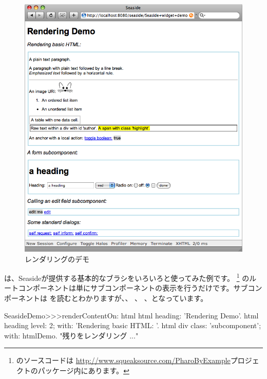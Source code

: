 \documentclass[a4paper,10pt,twoside]{book}
\begin{document}
\begin{figure}[ht]
\begin{center}
\includegraphics[width=\textwidth]{RenderingDemo}
\caption{レンダリングのデモ}
\end{center}
\end{figure}

は、Seasideが提供する基本的なブラシをいろいろと使ってみた例です。 \footnote{のソースコードは  \url{http://www.squeaksource.com/PharoByExample}プロジェクトのパッケージ内にあります。}
 のルートコンポーネントは単にサブコンポーネントの表示を行うだけです。サブコンポーネントは を読むとわかりますが、、 、 、となっています。

\needspace{7ex}
\begin{method}[renderdemo]{}
SeasideDemo>>>renderContentOn: html
	html heading: 'Rendering Demo'.
	html heading
		level: 2;
		with: 'Rendering basic HTML: '.
	html div
		class: 'subcomponent';
		with: htmlDemo.
	"残りをレンダリング ..."
\end{method}
\end{document}
